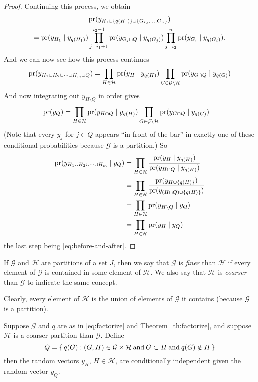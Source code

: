 \begin{proof}
Continuing this process, we obtain
\begin{multline*}
   \operatorname{pr}(y_{H_1 \cup \{q(H_1)\} \cup \{ G_{i_2}, \ldots, G_n \}})
   \\
   =
   \operatorname{pr}(y_{H_1} \mid y_{q(H_1)})
   \prod_{j = i_1 + 1}^{i_2 - 1}
   \operatorname{pr}(y_{G_j \cap Q} \mid y_{q(G_j)})
   \prod_{j = i_2}^n
   \operatorname{pr}(y_{G_i} \mid y_{q(G_i)}).
\end{multline*}
And we can now see how this process continues
$$
   \operatorname{pr}(y_{H_1 \cup H_2 \cup \cdots \cup H_m \cup Q})
   =
   \prod_{H \in \mathcal{H}}
   \operatorname{pr}(y_H \mid y_{q(H)})
   \prod_{G \in \mathcal{G} \setminus \mathcal{H}}
   \operatorname{pr}(y_{G \cap Q} \mid y_{q(G)})
$$
And now integrating out $y_{H \setminus Q}$ in order gives
\begin{align*}
   \operatorname{pr}(y_Q)
   & =
   \prod_{H \in \mathcal{H}}
   \operatorname{pr}(y_{H \cap Q} \mid y_{q(H)})
   \prod_{G \in \mathcal{G} \setminus \mathcal{H}}
   \operatorname{pr}(y_{G \cap Q} \mid y_{q(G)})
\end{align*}
(Note that every $y_j$ for $j \in Q$ appears ``in front of the bar'' in
exactly one of these conditional probabilities because $\mathcal{G}$
is a partition.)
So
\begin{align*}
   \operatorname{pr}(y_{H_1 \cup H_2 \cup \cdots \cup H_m} \mid y_Q)
   & =
   \prod_{H \in \mathcal{H}}
   \frac{ \operatorname{pr}(y_H \mid y_{q(H)}) }{ \operatorname{pr}(y_{H \cap Q} \mid y_{q(H)}) }
   \\
   & =
   \prod_{H \in \mathcal{H}}
   \frac{ \operatorname{pr}(y_{H \cup \{q(H)\}}) }{ \operatorname{pr}(y_{(H \cap Q) \cup \{q(H)\}}) }
   \\
   & =
   \prod_{H \in \mathcal{H}}
   \operatorname{pr}( y_{H \setminus Q} \mid y_{Q} )
   \\
   & =
   \prod_{H \in \mathcal{H}}
   \operatorname{pr}( y_H \mid y_{Q} )
\end{align*}
the last step being \eqref{eq:before-and-after}.
\end{proof}

If $\mathcal{G}$ and $\mathcal{H}$ are partitions of a set $J$,
then we say that $\mathcal{G}$ is \emph{finer} than $\mathcal{H}$
if every element of $\mathcal{G}$ is contained in some element
of $\mathcal{H}$.  We also say that $\mathcal{H}$ is \emph{coarser}
than $\mathcal{G}$ to indicate the same concept.

Clearly, every element of $\mathcal{H}$ is the union of elements
of $\mathcal{G}$ it contains (because $\mathcal{G}$ is a partition).

\begin{theorem} \label{th:markov}
Suppose $\mathcal{G}$ and $q$ are as in \eqref{eq:factorize}
and Theorem~\ref{th:factorize}, and suppose $\mathcal{H}$ is a coarser
partition than $\mathcal{G}$.  Define
\begin{equation} \label{eq:q-markov}
   Q = \{\,  q(G) : (G, H) \in \mathcal{G} \times \mathcal{H}
   \mathbin{\rm and} G \subset H \mathbin{\rm and} q(G) \notin H  \,\}
\end{equation}
then the random vectors $y_H$, $H \in \mathcal{H}$, are conditionally
independent given the random vector $y_Q$.
\end{theorem}

